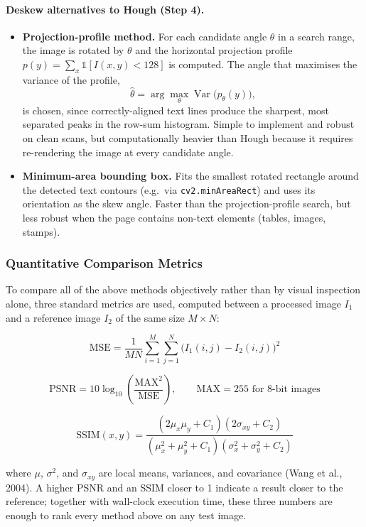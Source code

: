 \documentclass[12pt, a4paper]{article}
\begin{document}
\paragraph{Deskew alternatives to Hough (Step 4).}

\begin{itemize}
  \item \textbf{Projection-profile method.} For each candidate angle $\theta$ in a search range, the image is rotated by $\theta$ and the horizontal projection profile $p(y) = \sum_x \mathbb{1}[I(x,y) < 128]$ is computed. The angle that maximises the variance of the profile,
  \[
  \hat{\theta} = \arg\max_{\theta} \operatorname{Var}\big(p_\theta(y)\big),
  \]
  is chosen, since correctly-aligned text lines produce the sharpest, most separated peaks in the row-sum histogram. Simple to implement and robust on clean scans, but computationally heavier than Hough because it requires re-rendering the image at every candidate angle.
  \item \textbf{Minimum-area bounding box.} Fits the smallest rotated rectangle around the detected text contours (e.g.\ via \texttt{cv2.minAreaRect}) and uses its orientation as the skew angle. Faster than the projection-profile search, but less robust when the page contains non-text elements (tables, images, stamps).
\end{itemize}

\subsubsection*{Quantitative Comparison Metrics}

To compare all of the above methods objectively rather than by visual inspection alone, three standard metrics are used, computed between a processed image $I_1$ and a reference image $I_2$ of the same size $M\times N$:

\[
\text{MSE} = \frac{1}{MN}\sum_{i=1}^{M}\sum_{j=1}^{N}\big(I_1(i,j) - I_2(i,j)\big)^2
\]

\[
\text{PSNR} = 10 \log_{10}\!\left(\frac{\text{MAX}^2}{\text{MSE}}\right), \qquad \text{MAX} = 255 \text{ for 8-bit images}
\]

\[
\text{SSIM}(x,y) = \frac{(2\mu_x\mu_y + C_1)(2\sigma_{xy} + C_2)}{(\mu_x^2+\mu_y^2+C_1)(\sigma_x^2+\sigma_y^2+C_2)}
\]

where $\mu$, $\sigma^2$, and $\sigma_{xy}$ are local means, variances, and covariance (Wang et al., 2004). A higher PSNR and an SSIM closer to 1 indicate a result closer to the reference; together with wall-clock execution time, these three numbers are enough to rank every method above on any test image.
\end{document}
